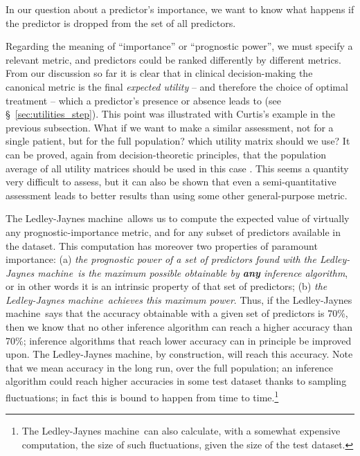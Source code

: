 \documentclass[utf8]{FrontiersinHarvard} %
\newcommand*{\sect}{\S}%
\newcommand*{\cf}{{cf.}}
\renewcommand*{\|}[1][]{\nonscript\:#1\vert\nonscript\:\mathopen{}}
\newcommand*{\ljm}{Ledley-Jaynes machine}
\begin{document}
In our question about a predictor's importance, we want to know what happens if the predictor is dropped from the set of all predictors.

Regarding the meaning of \enquote{importance} or \enquote{prognostic power}, we must specify a relevant metric, and predictors could be ranked differently by different metrics. From our discussion so far it is clear that in clinical decision-making the canonical metric is the final \emph{expected utility} -- and therefore the choice of optimal treatment -- which a predictor's presence or absence leads to (see \sect~\ref{sec:utilities_step}). This point was illustrated with Curtis's example in the previous subsection. What if we want to make a similar assessment, not for a single patient, but for the full population? which utility matrix should we use? It can be proved, again from decision-theoretic principles, that the population average of all utility matrices should be used in this case \citep[\cf][\sect~4.1]{dyrlandetal2022}. This seems a quantity very difficult to assess, but it can also be shown \citep[\sect~4.2]{dyrlandetal2022} that even a semi-quantitative assessment leads to better results than using some other general-purpose metric.

The \ljm\ allows us to compute the expected value of virtually any prognostic-importance metric, and for any subset of predictors available in the dataset. This computation has moreover two properties of paramount importance: (a) \emph{the prognostic power of a set of predictors found with the \ljm\ is the maximum possible obtainable by \textbf{any} inference algorithm}, or in other words it is an intrinsic property of that set of predictors; (b) \emph{the \ljm\ achieves this maximum power}. Thus, if the \ljm\ says that the accuracy obtainable with a given set of predictors is 70\%, then we know that no other inference algorithm can reach a higher accuracy than 70\%; inference algorithms that reach lower accuracy can in principle be improved upon. The \ljm, by construction, will reach this accuracy. Note that we mean accuracy in the long run, over the full population; an inference algorithm could reach higher accuracies in some test dataset thanks to sampling fluctuations; in fact this is bound to happen from time to time.\footnote{The \ljm\ can also calculate, with a somewhat expensive computation, the size of such fluctuations, given the size of the test dataset.}
\end{document}
